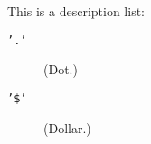 
This is a description list:

\begin{description}
\item[\texttt{'.'}]
(Dot.) 
\item[\texttt{'\$'}]
(Dollar.) 
\end{description}
